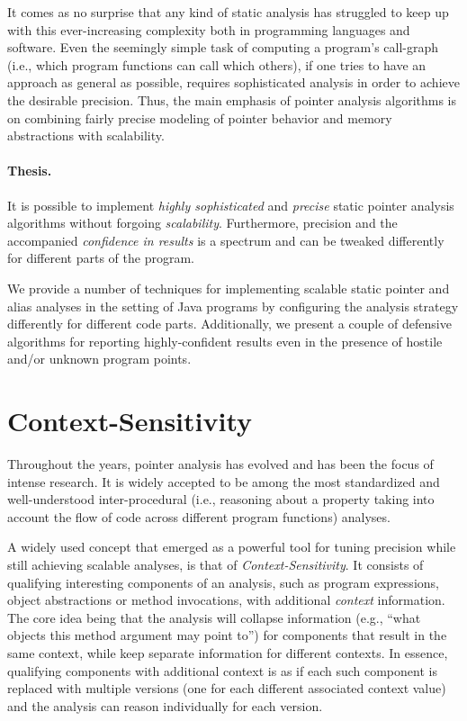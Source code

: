 It comes as no surprise that any kind of static analysis has struggled to keep up with this ever-increasing complexity both in programming languages and software. Even the seemingly simple task of computing a program's call-graph (i.e., which program functions can call which others), if one tries to have an approach as general as possible, requires sophisticated analysis in order to achieve the desirable precision. Thus, the main emphasis of pointer analysis algorithms is on combining fairly precise modeling of pointer behavior and memory abstractions with scalability.

\paragraph*{Thesis.}
\begin{displayquote}
It is possible to implement \emph{highly sophisticated} and \emph{precise} static pointer analysis algorithms without forgoing \emph{scalability}. Furthermore, precision and the accompanied \emph{confidence in results} is a spectrum and can be tweaked differently for different parts of the program.
\end{displayquote}

We provide a number of techniques for implementing scalable static pointer and alias analyses in the setting of Java programs by configuring the analysis strategy differently for different code parts. Additionally, we present a couple of defensive algorithms for reporting highly-confident results even in the presence of hostile and/or unknown program points.


\section{Context-Sensitivity}

Throughout the years, pointer analysis has evolved and has been the focus of intense research. It is widely accepted to be among the most standardized and well-understood inter-procedural (i.e., reasoning about a property taking into account the flow of code across different program functions) analyses.

A widely used concept that emerged as a powerful tool for tuning precision while still achieving scalable analyses, is that of \emph{Context-Sensitivity}. It consists of qualifying interesting components of an analysis, such as program expressions, object abstractions or method invocations, with additional \emph{context} information. The core idea being that the analysis will collapse information (e.g., ``what objects this method argument may point to'') for components that result in the same context, while keep separate information for different contexts. In essence, qualifying components with additional context is as if each such component is replaced with multiple versions (one for each different associated context value) and the analysis can reason individually for each version.


